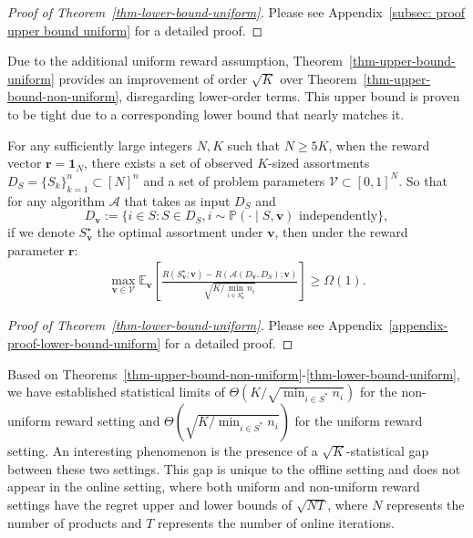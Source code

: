 \documentclass[10pt, letterpaper]{article}
\begin{document}
\begin{proof}[Proof of Theorem~\ref{thm-lower-bound-uniform}]
    Please see Appendix~\ref{subsec: proof upper bound uniform} for a detailed proof.
\end{proof}

Due to the additional uniform reward assumption, Theorem~\ref{thm-upper-bound-uniform} provides an improvement of order $\sqrt{K}$ over Theorem~\ref{thm-upper-bound-non-uniform}, disregarding lower-order terms. 
This upper bound is proven to be tight due to a corresponding lower bound that nearly matches it.

\begin{theorem}\label{thm-lower-bound-uniform}
For any sufficiently large integers $N,K$ such that $N\geq 5K$, when the reward vector $\bm{r} = \bm{1}_{N}$, there exists a set of observed $K$-sized assortments $D_S = \{S_k\}_{k=1}^n\subset [N]^n$ and a set of problem parameters $\mathcal{V}\subset [0,1]^N$. So that for any algorithm $\mathcal{A}$ that takes as input $D_S$ and $$D_{\bm{v}} := \{i \in S : S \in D_S, i \sim \mathbb{P}(\cdot \mid S, \bm{v}) \text{ independently}\},$$ if we denote $S^\star_{\bm{v}}$ the optimal assortment under $\bm{v}$, then under the reward parameter $\bm r$:
\begin{align*}
\max_{\bm{v} \in \mathcal{V}} \mathbb{E}_{\bm{v}} \left[  \frac{ R(S_{\bm{v}}^\star; \bm{v}) - R(\mathcal{A}(D_{\bm{v}}, D_S); \bm{v}) }{\sqrt{K/\min_{i \in S^\star_{\bm{v}}} n_i}} \right] \ge \Omega(1).
\end{align*}
\end{theorem}

\begin{proof}[Proof of Theorem~\ref{thm-lower-bound-uniform}]
    Please see Appendix~\ref{appendix-proof-lower-bound-uniform} for a detailed proof.
\end{proof}

Based on Theorems~\ref{thm-upper-bound-non-uniform}-\ref{thm-lower-bound-uniform}, we have established statistical limits of $\Theta(K/\sqrt{\min_{i \in S^*} n_i})$ for the non-uniform reward setting and $\Theta(\sqrt{K/\min_{i \in S^*} n_i})$ for the uniform reward setting. An interesting phenomenon is the presence of a $\sqrt{K}$-statistical gap between these two settings. This gap is unique to the offline setting and does not appear in the online setting, where both uniform and non-uniform reward settings have the regret upper and lower bounds of $\sqrt{NT}$, where $N$ represents the number of products and $T$ represents the number of online iterations.
\end{document}
